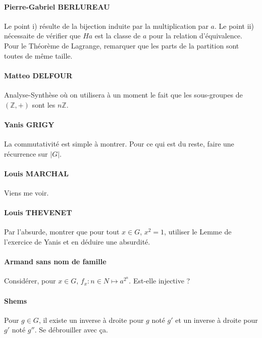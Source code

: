 \documentclass[17pt]{article}
\def\Z{\mathbb Z}
\begin{document}
	\paragraph{Pierre-Gabriel BERLUREAU} Le point i) résulte de la bijection induite par la multiplication par $a$. Le point ii) nécessaite de vérifier que $Ha$ est la classe  de $a$ pour la relation d'équivalence. Pour le Théorème de Lagrange, remarquer que les parts de la partition sont toutes de même taille.

	\paragraph{Matteo DELFOUR} Analyse-Synthèse où on utilisera à un moment le fait que les sous-groupes de $(\Z, +)$ sont les $n\Z$.

	\paragraph{Yanis GRIGY} La commutativité est simple à montrer. Pour ce qui est du reste, faire une récurrence sur $|G|$.

	\paragraph{Louis MARCHAL} Viens me voir.

	\paragraph{Louis THEVENET} Par l'absurde, montrer que pour tout $x\in G$, $x^2=1$, utiliser le Lemme de l'exercice de Yanis et en déduire une absurdité.

	\paragraph{Armand sans nom de famille} Considérer, pour $x\in G$, $f_x:n\in N\mapsto a^{2^n}$. Est-elle injective ?

	\paragraph{Shems} Pour $g\in G$, il existe un inverse à droite pour $g$ noté $g'$ et un inverse à droite pour $g'$ noté $g''$. Se débrouiller avec ça.
\end{document}
